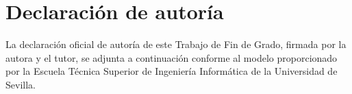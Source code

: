 \chapter{Declaración de autoría}\label{anexo:autoria}



\noindent La declaración oficial de autoría de este Trabajo de Fin de Grado, firmada por la autora y el tutor, se adjunta a continuación conforme al modelo proporcionado por la Escuela Técnica Superior de Ingeniería Informática de la Universidad de Sevilla.


